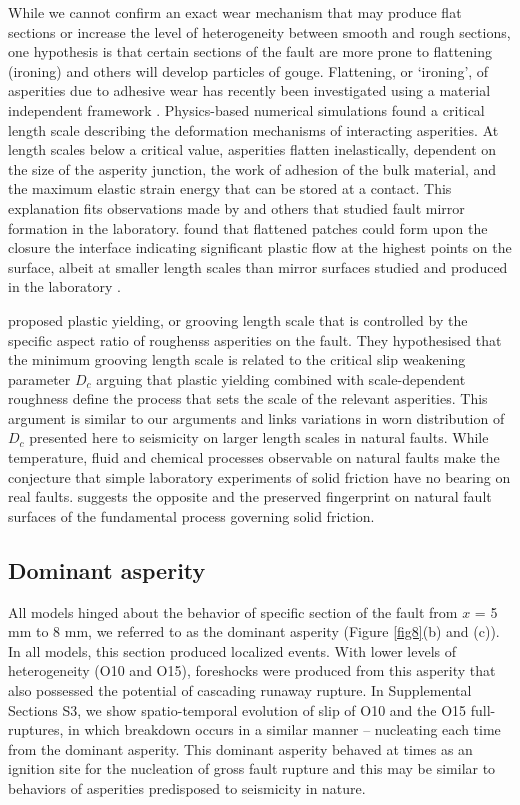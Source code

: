 \documentclass[preprint,1p, 10pt,authoryear]{elsarticle}
\begin{document}
While we cannot confirm an exact wear mechanism that may produce flat sections or increase the level of heterogeneity between smooth and rough sections, one hypothesis is that certain sections of the fault are more prone to flattening (ironing) and others will develop particles of gouge. Flattening, or ‘ironing’, of asperities due to adhesive wear has recently been investigated using a material independent framework \citep{Aghababaei2016}. Physics-based numerical simulations found a critical length scale describing the deformation mechanisms of interacting asperities. At length scales below a critical value, asperities flatten inelastically, dependent on the size of the asperity junction, the work of adhesion of the bulk material, and the maximum elastic strain energy that can be stored at a contact. This explanation fits observations made by \citet{Siman-Tov2013} and others that studied fault mirror formation in the laboratory. \citet{Brown1986} found that flattened patches could form upon the closure the interface indicating significant plastic flow at the highest points on the surface, albeit at smaller length scales than mirror surfaces studied and produced in the laboratory \citep{Fondriest2013, Siman-Tov2013, Tisato2012,Siman-Tov2015}.

\citet{Candela2016} proposed plastic yielding, or grooving length scale that is controlled by the specific aspect ratio of roughenss asperities on the fault. They hypothesised that the minimum grooving length scale is related to the critical slip weakening parameter $D_{c}$ arguing that plastic yielding combined with scale-dependent roughness define the process that sets the scale of the relevant asperities. This argument is similar to our arguments and links variations in worn distribution of $D_{c}$ presented here to seismicity on larger length scales in natural faults. While temperature, fluid and chemical processes observable on natural faults make the conjecture that simple laboratory experiments of solid friction have no bearing on real faults. \citet{Candela2016} suggests the opposite and the preserved fingerprint on natural fault surfaces of the fundamental process governing solid friction.


\subsection{Dominant asperity}
\label{Dominant}
All models hinged about the behavior of specific section of the fault from $x$ = 5 mm to 8 mm, we referred to as the dominant asperity (Figure \ref{fig8}(b) and (c)). In all models, this section produced localized events. With lower levels of heterogeneity (O10 and O15), foreshocks were produced from this asperity that also possessed the potential of cascading runaway rupture. In Supplemental Sections S3, we show spatio-temporal evolution of slip of O10 and the O15 full-ruptures, in which breakdown occurs in a similar manner -- nucleating each time from the dominant asperity. This dominant asperity behaved at times as an ignition site for the nucleation of gross fault rupture and this may be similar to behaviors of asperities predisposed to seismicity in nature.
\end{document}
